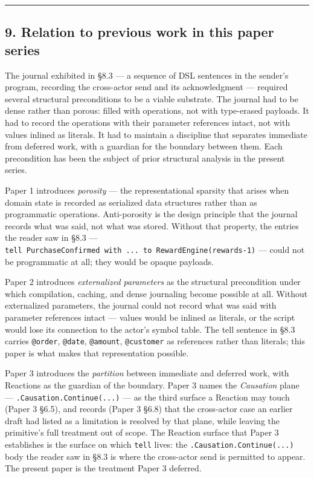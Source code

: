 \documentclass[
]{article}
\let\origtexttt\texttt%
\renewcommand{\texttt}[1]{\origtexttt{\seqsplit{#1}}}%
\let\texttt\origtexttt%
\begin{document}
\begin{center}\rule{0.5\linewidth}{0.5pt}\end{center}

\subsection{9. Relation to previous work in this paper
series}\label{relation-to-previous-work-in-this-paper-series}

The journal exhibited in §8.3 --- a sequence of DSL sentences in the
sender's program, recording the cross-actor send and its acknowledgment
--- required several structural preconditions to be a viable substrate.
The journal had to be dense rather than porous: filled with operations,
not with type-erased payloads. It had to record the operations with
their parameter references intact, not with values inlined as literals.
It had to maintain a discipline that separates immediate from deferred
work, with a guardian for the boundary between them. Each precondition
has been the subject of prior structural analysis in the present series.

Paper 1 introduces \emph{porosity} --- the representational sparsity
that arises when domain state is recorded as serialized data structures
rather than as programmatic operations. Anti-porosity is the design
principle that the journal records what was said, not what was stored.
Without that property, the entries the reader saw in §8.3 ---
\texttt{tell\ PurchaseConfirmed\ with\ ...\ to\ RewardEngine(\textquotesingle{}rewards-1\textquotesingle{})}
--- could not be programmatic at all; they would be opaque payloads.

Paper 2 introduces \emph{externalized parameters} as the structural
precondition under which compilation, caching, and dense journaling
become possible at all. Without externalized parameters, the journal
could not record what was said with parameter references intact ---
values would be inlined as literals, or the script would lose its
connection to the actor's symbol table. The tell sentence in §8.3
carries \texttt{@order}, \texttt{@date}, \texttt{@amount},
\texttt{@customer} as references rather than literals; this paper is
what makes that representation possible.

Paper 3 introduces the \emph{partition} between immediate and deferred
work, with Reactions as the guardian of the boundary. Paper 3 names the
\emph{Causation} plane --- \texttt{.Causation.Continue(...)} --- as the
third surface a Reaction may touch (Paper 3 §6.5), and records (Paper 3
§6.8) that the cross-actor case an earlier draft had listed as a
limitation is resolved by that plane, while leaving the primitive's full
treatment out of scope. The Reaction surface that Paper 3 establishes is
the surface on which \texttt{tell} lives: the
\texttt{.Causation.Continue(...)} body the reader saw in §8.3 is where
the cross-actor send is permitted to appear. The present paper is the
treatment Paper 3 deferred.
\end{document}
